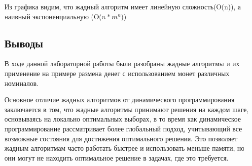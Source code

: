 \documentclass[12pt]{article}
\begin{document}
\begin{figure}[htbp]
    \centering
    \label{fig:graph}
\end{figure}

Из графика видим, что жадный алгоритм имеет линейную сложность(O(n)), а наивный экспоненциальную (O($n * m^n$))

\newpage
\subsection*{Выводы}

В ходе данной лабораторной работы были разобраны жадные алгоритмы и их применение на примере размена денег с использованием монет различных номиналов. 

Основное отличие жадных алгоритмов от динамического программирования заключается в том, что жадные алгоритмы принимают решения на каждом шаге, основываясь на локально оптимальных выборах, в то время как динамическое программирование рассматривает более глобальный подход, учитывающий все возможные состояния для достижения оптимального решения. Это позволяет жадным алгоритмам часто работать быстрее и использовать меньше памяти, но они могут не находить оптимальное решение в задачах, где это требуется.
\end{document}
